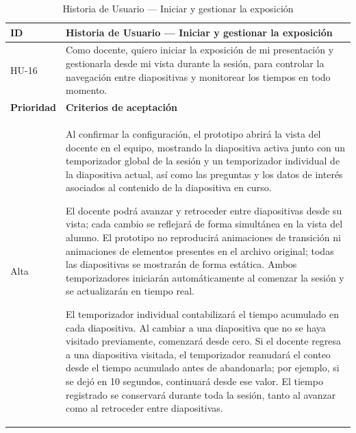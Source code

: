 \documentclass[11pt]{article}
\newcommand{\ttstyle}{%
  \small
  \setlength{\tabcolsep}{6pt}%
  \renewcommand{\arraystretch}{1.25}%
  \arrayrulecolor{azulprofundo}%
}
\newcommand{\hairrule}{%
  \arrayrulecolor{azulregla}\midrule[0.3pt]\arrayrulecolor{azulprofundo}%
}
\begin{document}
\begin{table}[H]
    \centering
    \renewcommand{\arraystretch}{1.2}
    \ttstyle
    \begin{tabular}{p{2.5cm}p{11cm}}
        \toprule
        \textbf{ID} & \textbf{Historia de Usuario --- Iniciar y gestionar la exposición} \\
        \midrule
        HU-16 & Como docente, quiero iniciar la exposición de mi presentación y gestionarla desde mi vista durante la sesión, para controlar la navegación entre diapositivas y monitorear los tiempos en todo momento. \\
        \hairrule
        \textbf{Prioridad} & \textbf{Criterios de aceptación} \\
        \hairrule
        Alta & Al confirmar la configuración, el prototipo abrirá la vista del docente en el equipo, mostrando la diapositiva activa junto con un temporizador global de la sesión y un temporizador individual de la diapositiva actual, así como las preguntas y los datos de interés asociados al contenido de la diapositiva en curso.

        El docente podrá avanzar y retroceder entre diapositivas desde su vista; cada cambio se reflejará de forma simultánea en la vista del alumno. El prototipo no reproducirá animaciones de transición ni animaciones de elementos presentes en el archivo original; todas las diapositivas se mostrarán de forma estática. Ambos temporizadores iniciarán automáticamente al comenzar la sesión y se actualizarán en tiempo real.

        El temporizador individual contabilizará el tiempo acumulado en cada diapositiva. Al cambiar a una diapositiva que no se haya visitado previamente, comenzará desde cero. Si el docente regresa a una diapositiva visitada, el temporizador reanudará el conteo desde el tiempo acumulado antes de abandonarla; por ejemplo, si se dejó en 10 segundos, continuará desde ese valor. El tiempo registrado se conservará durante toda la sesión, tanto al avanzar como al retroceder entre diapositivas. \\
        \bottomrule
    \end{tabular}
    \caption{Historia de Usuario --- Iniciar y gestionar la exposición}
    \label{tab:hu-iniciar-gestionar-exposicion}
\end{table}
\end{document}
